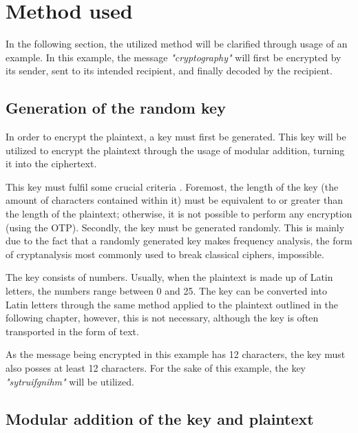\documentclass[12pt]{report}
\theoremstyle{definition}
\theoremstyle{remark}
\begin{document}
\section{Method used}
In the following section, the utilized method will be clarified through usage of an example. In this example, the message \textit{"cryptography"} will first be encrypted by its sender, sent to its intended recipient, and finally decoded by the recipient.

\subsection{Generation of the random key}
In order to encrypt the plaintext, a key must first be generated. This key will be utilized to encrypt the plaintext through the usage of modular addition, turning it into the ciphertext.

This key must fulfil some crucial criteria \cite{MilsElectronic}. Foremost, the length of the key (the amount of  characters contained within it) must be equivalent to or greater than the length of the plaintext; otherwise, it is not possible to perform any encryption (using the OTP). Secondly, the key must be generated randomly. This is mainly due to the fact that a randomly generated key makes frequency analysis\cite{FrequencyAnalysis}, the form of cryptanalysis most commonly used to break classical ciphers, impossible.


The key consists of numbers. Usually, when the plaintext is made up of Latin letters, the numbers range between 0 and 25. The key can be converted into Latin letters through the same method applied to the plaintext outlined in the following chapter, however, this is not necessary, although the key is often transported in the form of text.

As the message being encrypted in this example has 12 characters, the key must also posses at least 12 characters. For the sake of this example, the key \textit{"sytruifgnihm"} will be utilized.

\subsection{Modular addition of the key and plaintext}
\end{document}

